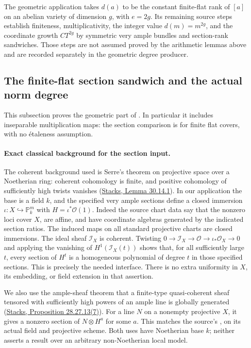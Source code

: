 The geometric application takes \(d(a)\) to be the constant
finite-flat rank of \([a]\) on an abelian variety of dimension
\(g\), with \(e=2g\).
Its remaining source steps establish finiteness, multiplicativity,
the integer value \(d(m)=m^{2g}\), and the coordinate growth
\(CT^{2g}\) by symmetric very ample bundles and section-rank
sandwiches.  Those steps are not assumed proved by the arithmetic
lemmas above and are recorded separately in the geometric degree
producer.


\subsection{The finite-flat section sandwich and the actual norm degree}
\label{subsec:faithful-geometric-norm-degree}

This subsection proves the geometric part of
.  In particular it includes
inseparable multiplication maps: the section comparison is for
finite flat covers, with no \'etaleness assumption.

\paragraph{Exact classical background for the section input.}
The coherent background used is Serre's theorem on projective
space over a Noetherian ring: coherent cohomology is finite,
and positive cohomology of sufficiently high twists vanishes
(\href{https://stacks.math.columbia.edu/tag/01YS}{Stacks, Lemma 30.14.1}).
In our application the base is a field \(k\), and the specified
very ample sections define a closed immersion
\(\iota:X\hookrightarrow\mathbb P^m_k\) with
\(H=\iota^*\mathcal O(1)\).
Indeed the source chart data say that the nonzero loci cover
\(X\), are affine, and have coordinate algebras generated by
the indicated section ratios.  The induced maps on all
standard projective charts are closed immersions.
The ideal sheaf \(\mathcal I_X\) is coherent.  Twisting
\(0\to\mathcal I_X\to\mathcal O\to\iota_*\mathcal O_X\to0\)
and applying the vanishing of \(H^1(\mathcal I_X(t))\)
shows that, for all sufficiently large \(t\), every section
of \(H^t\) is a homogeneous polynomial of degree \(t\) in those
specified sections.  This is precisely the needed
 interface.
There is no extra uniformity in \(X\), its embedding, or field
extension in that assertion.

We also use the ample-sheaf theorem that a finite-type
quasi-coherent sheaf tensored with sufficiently high powers
of an ample line is globally generated
(\href{https://stacks.math.columbia.edu/tag/01Q3}{Stacks, Proposition 28.27.13(7)}).
For a line \(N\) on a nonempty projective \(X\), it gives a
nonzero section of \(N\otimes H^a\) for some \(a\).
This matches the source's
, on its actual field
and projective scheme.
Both uses have Noetherian base \(k\); neither asserts a result
over an arbitrary non-Noetherian local model.

